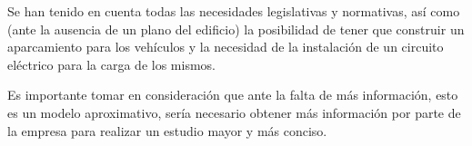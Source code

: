 Se han tenido en cuenta todas las necesidades legislativas y normativas, así como (ante la ausencia de un plano del edificio) la posibilidad de tener que construir un aparcamiento para los vehículos y la necesidad de la instalación de un circuito eléctrico para la carga de los mismos. 

Es importante tomar en consideración que ante la falta de más información, esto es un modelo aproximativo, sería necesario obtener más información por parte de la empresa para realizar un estudio mayor y más conciso.